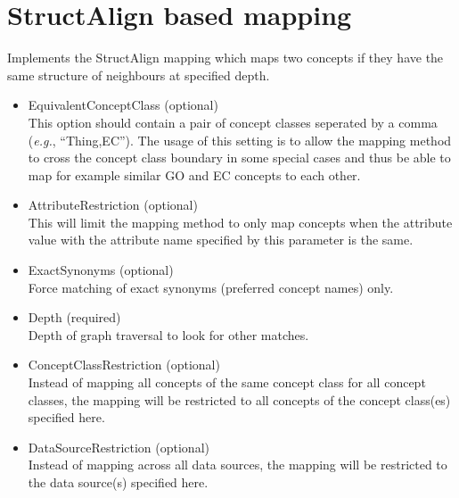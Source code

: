     
\section{StructAlign based mapping}
Implements the StructAlign mapping which maps two concepts if they have the same structure of neighbours at specified depth.

\begin{itemize}
  
  \item{EquivalentConceptClass (optional)}\\
  This option should contain a pair of concept classes seperated by a comma ({\it{e.g.}}, ``Thing,EC'').
  The usage of this setting is to allow the mapping method to cross the concept class boundary in some special cases
  and thus be able to map for example similar GO and EC concepts to each other.
  
  \item{AttributeRestriction (optional)}\\
  This will limit the mapping method to only map concepts when the attribute value with the attribute name
  specified by this parameter is the same.
  
  \item{ExactSynonyms (optional)}\\
  Force matching of exact synonyms (preferred concept names) only.
  
  \item{Depth (required)}\\
  Depth of graph traversal to look for other matches.
  
  \item{ConceptClassRestriction (optional)}\\
  Instead of mapping all concepts of the same concept class for all concept classes, 
  the mapping will be restricted to all concepts of the concept class(es) specified here.
  
  \item{DataSourceRestriction (optional)}\\
  Instead of mapping across all data sources, the mapping will be restricted to the data source(s) specified here.

\end{itemize}


